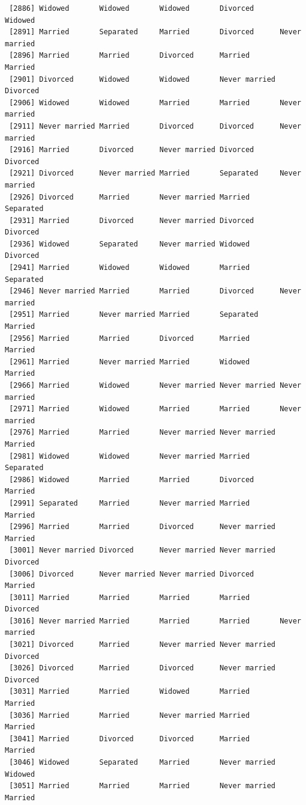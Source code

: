 \documentclass[
  letterpaper,
  DIV=11,
  numbers=noendperiod,
  oneside]{scrartcl}
\begin{document}
\begin{verbatim}
 [2886] Widowed       Widowed       Widowed       Divorced      Widowed      
 [2891] Married       Separated     Married       Divorced      Never married
 [2896] Married       Married       Divorced      Married       Married      
 [2901] Divorced      Widowed       Widowed       Never married Divorced     
 [2906] Widowed       Widowed       Married       Married       Never married
 [2911] Never married Married       Divorced      Divorced      Never married
 [2916] Married       Divorced      Never married Divorced      Divorced     
 [2921] Divorced      Never married Married       Separated     Never married
 [2926] Divorced      Married       Never married Married       Separated    
 [2931] Married       Divorced      Never married Divorced      Divorced     
 [2936] Widowed       Separated     Never married Widowed       Divorced     
 [2941] Married       Widowed       Widowed       Married       Separated    
 [2946] Never married Married       Married       Divorced      Never married
 [2951] Married       Never married Married       Separated     Married      
 [2956] Married       Married       Divorced      Married       Married      
 [2961] Married       Never married Married       Widowed       Married      
 [2966] Married       Widowed       Never married Never married Never married
 [2971] Married       Widowed       Married       Married       Never married
 [2976] Married       Married       Never married Never married Married      
 [2981] Widowed       Widowed       Never married Married       Separated    
 [2986] Widowed       Married       Married       Divorced      Married      
 [2991] Separated     Married       Never married Married       Married      
 [2996] Married       Married       Divorced      Never married Married      
 [3001] Never married Divorced      Never married Never married Divorced     
 [3006] Divorced      Never married Never married Divorced      Married      
 [3011] Married       Married       Married       Married       Divorced     
 [3016] Never married Married       Married       Married       Never married
 [3021] Divorced      Married       Never married Never married Divorced     
 [3026] Divorced      Married       Divorced      Never married Divorced     
 [3031] Married       Married       Widowed       Married       Married      
 [3036] Married       Married       Never married Married       Married      
 [3041] Married       Divorced      Divorced      Married       Married      
 [3046] Widowed       Separated     Married       Never married Widowed      
 [3051] Married       Married       Married       Never married Married      

\end{verbatim}
\end{document}
